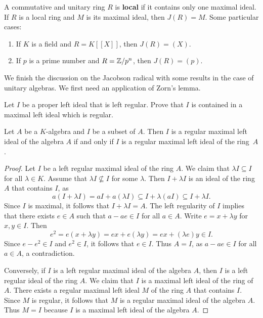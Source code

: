 \begin{example}
    A commutative and unitary ring $R$ is \textbf{local} if it contains
    only one maximal ideal. 
	If $R$ is a local ring and $M$ is its maximal ideal, then $J(R)=M$. Some particular cases: 
	\begin{enumerate}
		\item If $K$ is a field and $R=K[\![X]\!]$, then $J(R)=(X)$. 
		\item If $p$ is a prime number and $R=\mathbb{Z}/p^n$, then $J(R)=(p)$. 
	\end{enumerate}
\end{example}

We finish the discussion on the Jacobson radical with 
some results in the case of unitary algebras. We first need an application of Zorn's lemma. 

\begin{exercise}
\label{xca:maximal_regular}
    Let $I$ be a proper left ideal that is left regular. Prove that $I$ is contained in a maximal left ideal 
    which is regular. 
\end{exercise}


\begin{proposition}
	Let $A$ be a $K$-algebra and $I$ be a subset of $A$. Then $I$ is 
	a regular maximal left ideal of the algebra $A$ if and only if $I$ is 
	a regular maximal left ideal of the ring~$A$.
\end{proposition}

\begin{proof}
	Let $I$ be a left regular maximal ideal of the ring $A$. We claim that
	$\lambda I\subseteq I$ for all $\lambda\in K$. Assume that 
	$\lambda I\not\subseteq I$ for some $\lambda$. Then $I+\lambda I$
	is an ideal of the ring $A$ that contains $I$, as 
	\[
	a(I+\lambda I)=aI+a(\lambda I)\subseteq I+\lambda (aI)\subseteq I+\lambda I.
	\]
	Since $I$ is maximal, it follows that $I+\lambda I=A$. 
	The left regularity of $I$ implies that there exists $e\in A$
	such that 
	$a-ae\in I$ for all $a\in A$. Write $e=x+\lambda y$ for $x,y\in
	I$. Then 
	\[
		e^2=e(x+\lambda y)=ex+e(\lambda y)=ex+(\lambda e)y\in I.
	\]
	Since $e-e^2\in I$ and $e^2\in I$, it follows that $e\in I$. Thus $A=I$, as
	$a-ae\in I$ for all $a\in A$, a contradiction.

	Conversely, if $I$ is a left regular maximal ideal of the algebra $A$, then 
	$I$ is a left regular ideal of the ring $A$. We claim that $I$ is a maximal left ideal of the ring of $A$. 
	There exists a regular maximal left ideal $M$ 
	of the ring $A$ that contains $I$. Since 
	$M$ is regular, it follows that $M$ is a regular maximal ideal of the algebra $A$. Thus 
	$M=I$ because $I$ is a maximal left ideal of the algebra $A$. 
\end{proof}

